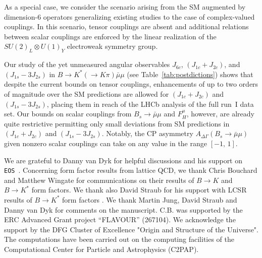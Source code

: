 \documentclass[twocolumn,epjc3]{svjour3}
\numberwithin{equation}{section}
\def \reftab#1{Table~\ref{#1}}
\renewcommand{\[}{\big[}
\renewcommand{\]}{\big]}
\renewcommand{\(}{\big(}
\renewcommand{\)}{\big)}
\def \eos{\texttt{EOS}}
\begin{document}
As a special case, we consider the scenario arising from the SM
augmented by dimension-6 operators generalizing existing studies to
the case of complex-valued couplings. In this scenario, tensor
couplings are absent and additional relations between scalar couplings
are enforced by the linear realization of the $SU(2)_L \otimes U(1)_Y$
electroweak symmetry group.

Our study of the {yet unmeasured} angular observables $J_{6c}$,
$(J_{1c} + J_{2c})$, and $(J_{1s} - 3 J_{2s})$ in $B\to K^* (\to K\pi)
\bar\mu\mu$ (see \reftab{tab:postdictions}) shows that despite the
current bounds on tensor couplings, enhancements of up to two orders
of magnitude over the SM predictions are allowed for $(J_{1c} +
J_{2c})$ and $(J_{1s} - 3 J_{2s})$, placing them in reach of the LHCb
analysis of the full run~I data set. Our bounds on scalar couplings
from $B_s\to \bar\mu\mu$ and $F_H^\mu$, however, are already quite
restrictive permitting only small deviations from SM predictions in
$(J_{1c} + J_{2c})$ and $(J_{1s} - 3 J_{2s})$. Notably, the CP
asymmetry $A_{\Delta\Gamma}(B_s\to \bar\mu\mu)$ given nonzero scalar
couplings can take on any value in the range $[-1,\, 1]$.

%
%
%
\begin{acknowledgements}
  We are grateful to Danny van Dyk for helpful discussions and his support on
  \eos~\cite{EOS}. Concerning form factor results from lattice QCD, we thank
  Chris Bouchard and Matthew Wingate for communications on their results of
  $B\to K$ \cite{Bouchard:2013eph} and $B\to K^*$ \cite{Horgan:2015vla} form
  factors. We thank also David Straub for his support with LCSR results of $B\to
  K^*$ form factors \cite{Straub:2015ica}. We thank Martin Jung, David Straub
  and Danny van Dyk for comments on the manuscript. C.B. was supported by the ERC
  Advanced Grant project ``FLAVOUR'' (267104). We acknowledge the support by the
  DFG Cluster of Excellence "Origin and Structure of the Universe". The
  computations have been carried out on the computing facilities of the
  Computational Center for Particle and Astrophysics (C2PAP).
\end{acknowledgements}


%
%

\appendix
\end{document}
